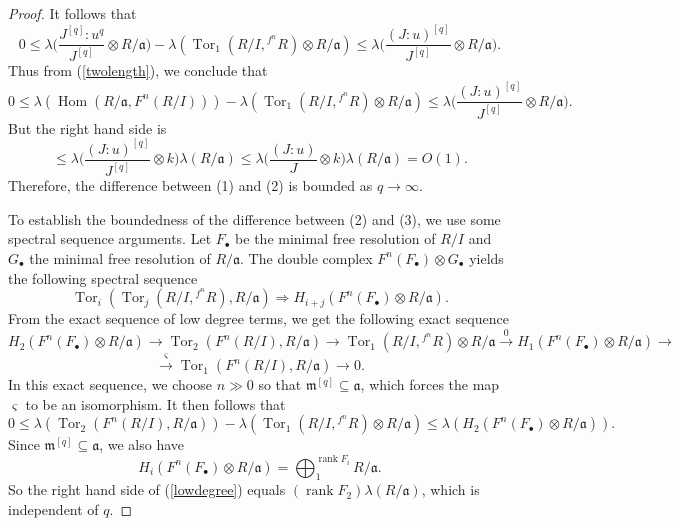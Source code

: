 \documentclass[draft]{amsart}
\theoremstyle{definition}
\numberwithin{equation}{theorem}
\begin{document}
\begin{proof}
It follows that 
\[0 \leq {\lambda} \bigg(\dfrac{J^{[q]}:u^q}{J^{[q]}}  \otimes R/{\mathfrak{a}} \bigg)-{\lambda} ({\mathop{\mathrm{Tor}}\nolimits}_1(R/I, {}^{f^n}\!\! R)\otimes  R/ {\mathfrak{a}}) \leq {\lambda} \bigg(\dfrac{(J:u)^{[q]}}{J^{[q]}} \otimes R/ {\mathfrak{a}}\bigg). \]
Thus from (\ref{twolength}), we conclude that
\[0 \leq {\lambda} ({\mathop{\mathrm{Hom}}\nolimits}(R/ {\mathfrak{a}}, F^n(R/I)))-{\lambda} ({\mathop{\mathrm{Tor}}\nolimits}_1(R/I, {}^{f^n}\!\! R)\otimes  R/ {\mathfrak{a}}) \leq {\lambda} \bigg(\dfrac{(J:u)^{[q]}}{J^{[q]}} \otimes R/ {\mathfrak{a}}\bigg).\]
But the right hand side is 
\[ \leq {\lambda} \bigg(\dfrac{(J:u)^{[q]}}{J^{[q]}} \otimes k\bigg) {\lambda}(R/ {\mathfrak{a}})\leq {\lambda} \bigg(\dfrac{(J:u)}{J} \otimes k\bigg) {\lambda}(R/ {\mathfrak{a}}) =O(1).\]
Therefore, the difference between (1) and (2) is bounded as $q \to {{\infty}}$.

To establish the boundedness of the difference between (2) and (3), we use some spectral sequence arguments.
Let $F_\bullet$ be the minimal free resolution of $R/I$ and $G_\bullet$ the minimal free resolution of $R/{\mathfrak{a}}$.  The double complex $F^n(F_\bullet) \otimes G_\bullet$ yields the following spectral sequence
\[{\mathop{\mathrm{Tor}}\nolimits}_i ({\mathop{\mathrm{Tor}}\nolimits}_j(R/I, {}^{f^n}\!\! R), R/{\mathfrak{a}}) \Rightarrow H_{i+j}(F^n(F_\bullet) \otimes R/ {\mathfrak{a}}).\]
From the exact sequence of low degree terms, we get the following exact sequence
\[H_2(F^n(F_\bullet) \otimes R/ {\mathfrak{a}}) \to {\mathop{\mathrm{Tor}}\nolimits}_2(F^n(R/I),R/ {\mathfrak{a}}) \to {\mathop{\mathrm{Tor}}\nolimits}_1(R/I, {}^{f^n}\!\! R)\otimes R/ {\mathfrak{a}}  \overset{0}{\to} H_1(F^n(F_\bullet) \otimes R/ {\mathfrak{a}})  \to\]
\[ \overset{\varsigma}{\to}  {\mathop{\mathrm{Tor}}\nolimits}_1(F^n(R/I),R/ {\mathfrak{a}}) \to 0.\]
In this exact sequence, we choose $n \gg 0$ so that ${\mathfrak{m}}^{[q]} \subseteq {\mathfrak{a}}$, which forces the map $\varsigma$ to be an isomorphism. It then follows that
\begin{equation}\label{lowdegree}
0 \leq {\lambda}({\mathop{\mathrm{Tor}}\nolimits}_2(F^n(R/I),R/ {\mathfrak{a}})) - {\lambda} ({\mathop{\mathrm{Tor}}\nolimits}_1(R/I, {}^{f^n}\!\! R)\otimes R/ {\mathfrak{a}}) \leq {\lambda}(H_2(F^n(F_\bullet) \otimes R/ {\mathfrak{a}})).
\end{equation}
Since ${\mathfrak{m}}^{[q]} \subseteq {\mathfrak{a}}$, we also have
\[H_{i}(F^n(F_\bullet) \otimes R/ {\mathfrak{a}}) =\bigoplus_1^{{\mathop{\mathrm{rank}}\nolimits} F_i} R/ {\mathfrak{a}} .\]
So the right hand side of (\ref{lowdegree}) equals $({\mathop{\mathrm{rank}}\nolimits} F_2){\lambda}(R/{\mathfrak{a}})$, which is independent of $q$.
\end{proof}
 
\end{document}
